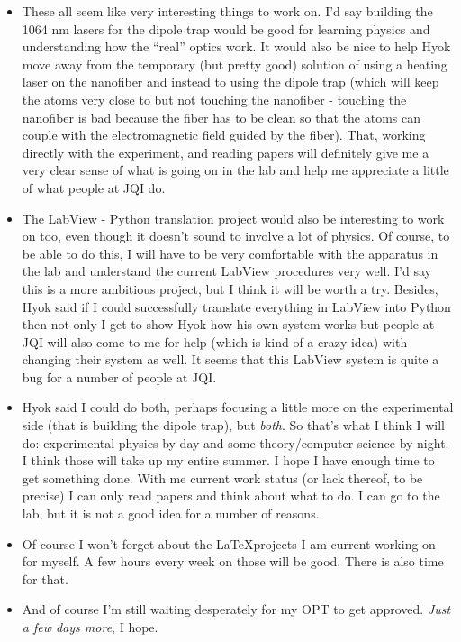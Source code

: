 \documentclass{book}
\theoremstyle{definition}
\begin{document}
\begin{itemize}
	
	\item These all seem like very interesting things to work on. I'd say building the 1064 nm lasers for the dipole trap would be good for learning physics and understanding how the ``real'' optics work. It would also be nice to help Hyok move away from the temporary (but pretty good) solution of using a heating laser on the nanofiber and instead to using the dipole trap (which will keep the atoms very close to but not touching the nanofiber - touching the nanofiber is bad because the fiber has to be clean so that the atoms can couple with the electromagnetic field guided by the fiber). That, working directly with the experiment, and reading papers will definitely give me a very clear sense of what is going on in the lab and help me appreciate a little of what people at JQI do. 
	
	
	\item The LabView - Python translation project would also be interesting to work on too, even though it doesn't sound to involve a lot of physics. Of course, to be able to do this, I will have to be very comfortable with the apparatus in the lab and understand the current LabView procedures very well. I'd say this is a more ambitious project, but I think it will be worth a try. Besides, Hyok said if I could successfully translate everything in LabView into Python then not only I get to show Hyok how his own system works but people at JQI will also come to me for help (which is kind of a crazy idea) with changing their system as well. It seems that this LabView system is quite a bug for a number of people at JQI. 
	
	
	\item Hyok said I could do both, perhaps focusing a little more on the experimental side (that is building the dipole trap), but \textit{both}. So that's what I think I will do: experimental physics by day and some theory/computer science by night. I think those will take up my entire summer. I hope I have enough time to get something done. With me current work status (or lack thereof, to be precise) I can only read papers and think about what to do. I can go to the lab, but it is not a good idea for a number of reasons.
	
	
	\item Of course I won't forget about the \LaTeX projects I am current working on for myself. A few hours every week on those will be good. There is also time for that. 
	
	\item And of course I'm still waiting desperately for my OPT to get approved. \textit{Just a few days more}, I hope. 
	
	
	\end{itemize}
\end{document}
